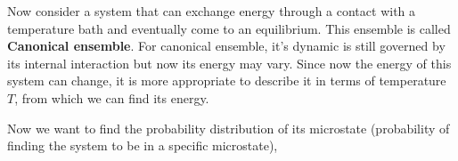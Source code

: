 \documentclass{article}
\begin{document}
Now consider a system that can exchange energy through a contact with a temperature bath and eventually 
come to an equilibrium. This ensemble is called \textbf{Canonical ensemble}. For canonical ensemble, 
it's dynamic is still governed by its internal interaction but now its energy may vary. Since now 
the energy of this system can change, it is more appropriate to describe it in terms of 
temperature $T$, from which we can find its energy. 

Now we want to find the probability distribution of its microstate (probability of finding the system 
to be in a specific microstate),
\end{document}
